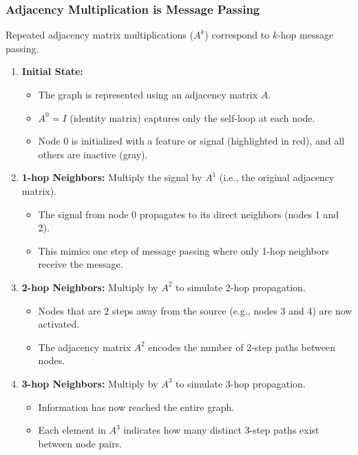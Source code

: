\subsubsection{Adjacency Multiplication is Message Passing}
\begin{process} Repeated adjacency matrix multiplications ($A^k$) correspond to $k$-hop message passing.
    \begin{enumerate}
        \item \textbf{Initial State:}
        \begin{itemize}
            \item The graph is represented using an adjacency matrix $A$.
            \item $A^0 = I$ (identity matrix) captures only the self-loop at each node.
            \item Node 0 is initialized with a feature or signal (highlighted in red), and all others are inactive (gray).
        \end{itemize}
    
        \item \textbf{1-hop Neighbors:} Multiply the signal by $A^1$ (i.e., the original adjacency matrix).
        \begin{itemize}
            \item The signal from node 0 propagates to its direct neighbors (nodes 1 and 2).
            \item This mimics one step of message passing where only 1-hop neighbors receive the message.
        \end{itemize}
    
        \item \textbf{2-hop Neighbors:} Multiply by $A^2$ to simulate 2-hop propagation.
        \begin{itemize}
            \item Nodes that are 2 steps away from the source (e.g., nodes 3 and 4) are now activated.
            \item The adjacency matrix $A^2$ encodes the number of 2-step paths between nodes.
        \end{itemize}
    
        \item \textbf{3-hop Neighbors:} Multiply by $A^3$ to simulate 3-hop propagation.
        \begin{itemize}
            \item Information has now reached the entire graph.
            \item Each element in $A^3$ indicates how many distinct 3-step paths exist between node pairs.
        \end{itemize}
    \end{enumerate}    
\end{process}
\newpage

